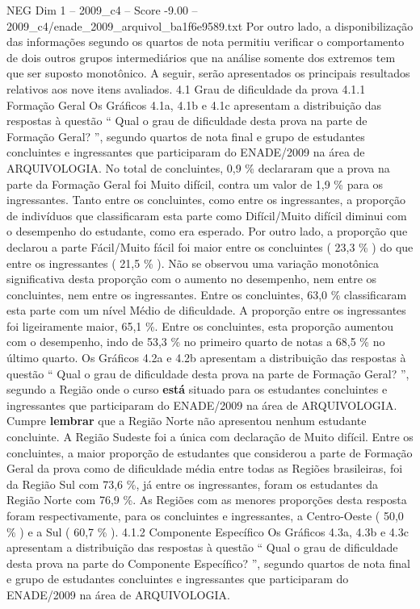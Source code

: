 \begin{textsample}{NEG Dim 1 – 2009\_c4 – Score -9.00 – 2009\_c4/enade\_2009\_arquivol\_ba1f6e9589.txt}
Por outro lado, a disponibilização das informações segundo os quartos de nota permitiu verificar o comportamento de dois outros grupos intermediários que na análise somente dos extremos tem que ser suposto monotônico.
A seguir, serão apresentados os principais resultados relativos aos nove itens avaliados. 4.1 Grau de dificuldade da prova 4.1.1 Formação Geral Os Gráficos 4.1a, 4.1b e 4.1c apresentam a distribuição das respostas à questão “ Qual o grau de dificuldade desta prova na parte de Formação Geral? ”, segundo quartos de nota final e grupo de estudantes concluintes e ingressantes que participaram do ENADE/2009 na área de ARQUIVOLOGIA.
No total de concluintes, 0,9 \% declararam que a prova na parte da Formação Geral foi Muito difícil, contra um valor de 1,9 \% para os ingressantes.
Tanto entre os concluintes, como entre os ingressantes, a proporção de indivíduos que classificaram esta parte como Difícil/Muito difícil diminui com o desempenho do estudante, como era esperado.
Por outro lado, a proporção que declarou a parte Fácil/Muito fácil foi maior entre os concluintes ( 23,3 \% ) do que entre os ingressantes ( 21,5 \% ).
Não se observou uma variação monotônica significativa desta proporção com o aumento no desempenho, nem entre os concluintes, nem entre os ingressantes.
Entre os concluintes, 63,0 \% classificaram esta parte com um nível Médio de dificuldade.
A proporção entre os ingressantes foi ligeiramente maior, 65,1 \%.
Entre os concluintes, esta proporção aumentou com o desempenho, indo de 53,3 \% no primeiro quarto de notas a 68,5 \% no último quarto.
Os Gráficos 4.2a e 4.2b apresentam a distribuição das respostas à questão “ Qual o grau de dificuldade desta prova na parte de Formação Geral? ”, segundo a Região onde o curso \textbf{está} situado para os estudantes concluintes e ingressantes que participaram do ENADE/2009 na área de ARQUIVOLOGIA.
Cumpre \textbf{lembrar} que a Região Norte não apresentou nenhum estudante concluinte.
A Região Sudeste foi a única com declaração de Muito difícil.
Entre os concluintes, a maior proporção de estudantes que considerou a parte de Formação Geral da prova como de dificuldade média entre todas as Regiões brasileiras, foi da Região Sul com 73,6 \%, já entre os ingressantes, foram os estudantes da Região Norte com 76,9 \%.
As Regiões com as menores proporções desta resposta foram respectivamente, para os concluintes e ingressantes, a Centro-Oeste ( 50,0 \% ) e a Sul ( 60,7 \% ). 4.1.2 Componente Específico Os Gráficos 4.3a, 4.3b e 4.3c apresentam a distribuição das respostas à questão “ Qual o grau de dificuldade desta prova na parte do Componente Específico? ”, segundo quartos de nota final e grupo de estudantes concluintes e ingressantes que participaram do ENADE/2009 na área de ARQUIVOLOGIA.

\end{textsample}
